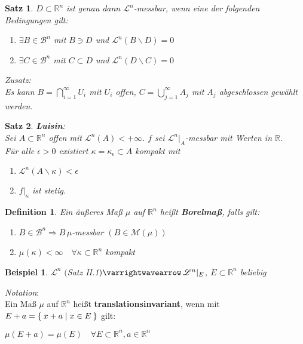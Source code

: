 \documentclass[11pt]{memoir}
\theoremstyle{changebreak}
\newtheorem{Definition}{Definition}[chapter]
\newtheorem{Beispiel}{Beispiel}[chapter]
\newtheorem{Satz}{Satz}[chapter]
\begin{document}
\begin{Satz}
	$D \subset \mathbb{R}^n$ ist genau dann $\mathscr{L}^n$-messbar, wenn eine der folgenden Bedingungen gilt:
	\begin{enumerate}
		\item $\exists B \in \mathscr{B}^n$ mit $B \ni D$ und $\mathscr{L}^n(B \backslash D) = 0$
		\item $\exists C \in \mathscr{B}^n$ mit $C \subset D$ und $\mathscr{L}^n(D \backslash C) = 0$
	\end{enumerate}
	\textit{Zusatz:}\\
	Es kann $B = \bigcap\limits_{i = 1}^\infty U_i$ mit $U_i$ offen, $C = \bigcup\limits_{j = 1}^\infty A_j$ mit $A_j$
	abgeschlossen gewählt werden.
\end{Satz}

\begin{Satz}
\emph{\textbf{Luisin}}: \\
Sei $A \subset \mathbb R^n$ offen mit $\mathscr L^n(A) < + \infty$. $f$ sei $\mathscr L^n\vert_A$-messbar mit Werten in $\mathbb R$. \\
Für alle $\epsilon > 0$ existiert $\kappa = \kappa_\epsilon \subset A$ kompakt mit
\begin{enumerate}
	\item $\mathscr L^n(A \backslash \kappa) < \epsilon$
	\item $f|_\kappa$ ist stetig.
\end{enumerate}
\end{Satz}



\begin{Definition}
Ein äußeres Maß $\mu$ auf $\mathbb R^n$ heißt \textbf{Borelmaß}, falls gilt:
\begin{enumerate}
	\item $B \in \mathscr B^n \Rightarrow B \, \mu$-messbar $(B \in \mathscr M(\mu))$
	\item $\mu(\kappa) < \infty \quad \forall \kappa \subset \mathbb R^n$ kompakt
\end{enumerate}
\end{Definition}

\begin{Beispiel}
$\mathscr L^n$ $($Satz II.1$) \varrightwavearrow \, \mathscr L^n|_E$, $E \subset \mathbb R^n$ beliebig
\end{Beispiel}

\emph{Notation}: \\
Ein Maß $\mu$ auf $\mathbb R^n$ heißt \textbf{translationsinvariant}, wenn mit $E + a = \Set{x +a | x \in E}$ gilt:
\begin{center}
	$\mu(E+a) = \mu(E) \quad \forall E \subset \mathbb R^n, a \in \mathbb R^n$
\end{center}
\end{document}
